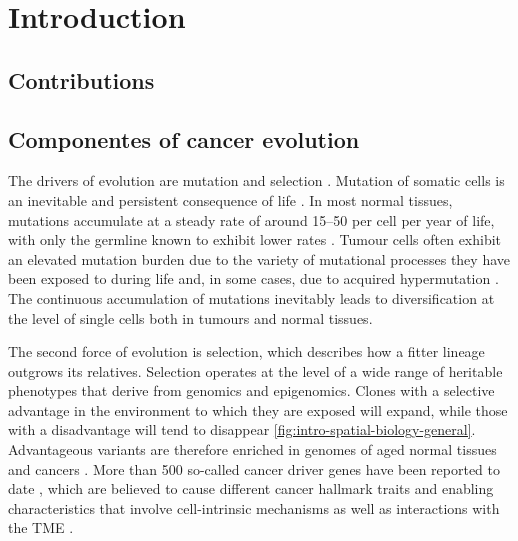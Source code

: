 \chapter{Introduction}

\section*{Contributions}

\section{Componentes of cancer evolution}

The drivers of evolution are mutation and selection \parencite{Cairns1975-oz,Nowell1976-sm}. Mutation of somatic cells is an inevitable and persistent consequence of life \parencite{Martincorena2015-br, Moore2021-yr, Li2021-th}. In most normal tissues, mutations accumulate at a steady rate of around 15–50 per cell per year of life, with only the germline known to exhibit lower rates \parencite{Moore2021-yr}. Tumour cells often exhibit an elevated mutation burden due to the variety of mutational processes they have been exposed to during life and, in some cases, due to acquired hypermutation \parencite{Alexandrov2020-uo}. The continuous accumulation of mutations inevitably leads to diversification at the level of single cells both in tumours and normal tissues.

The second force of evolution is selection, which describes how a fitter lineage outgrows its relatives. Selection operates at the level of a wide range of heritable phenotypes that derive from genomics and epigenomics. Clones with a selective advantage in the environment to which they are exposed will expand, while those with a disadvantage will tend to disappear \cref{fig:intro-spatial-biology-general}. Advantageous variants are therefore enriched in genomes of aged normal tissues and cancers \parencite{Greenman2006-cx,Martincorena2017-uw}. More than 500 so-called cancer driver genes have been reported to date \parencite{Lawrence2013-mi,Gonzalez-Perez2013-vo,Sondka2018-xf}, which are believed to cause different cancer hallmark traits and enabling characteristics that involve cell-intrinsic mechanisms as well as interactions with the \ac{TME} \parencite{Hanahan2000-ze, Hanahan2022-eb}.


